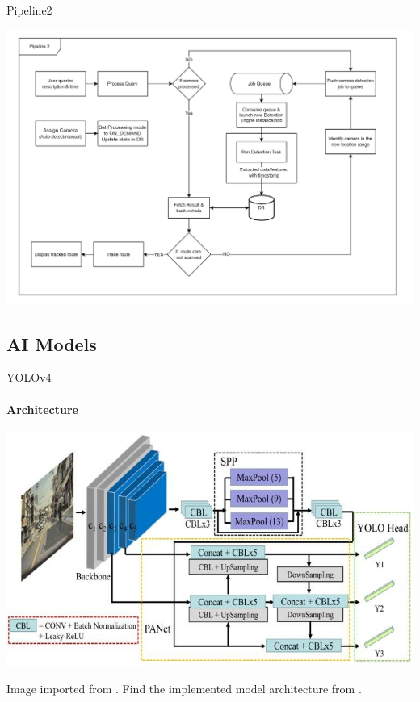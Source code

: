 \documentclass{beamer}
\newcommand{\link}[2]{\href{#1}{\textit{\color{blue}{#2}}}}%
\begin{document}
	\begin{frame}{Pipeline2}
		\begin{center}
			\includegraphics[width=\linewidth]{res/pipeline2}
		\end{center}
	\end{frame}

	\subsection{AI Models}
	\begin{frame}{YOLOv4}
		\framesubtitle{Architecture}
		\begin{center}
			\includegraphics[width=0.8\linewidth]{res/YOLOV4-research-gate.png}
		\end{center}
		Image imported from \link{https://www.researchgate.net/figure/Overall-structure-of-YOLOv4-including-CSPDarknet-backbone-SPPnet-PANet-and-3-YOLO\_fig2\_344919620}{researchgate}. Find the implemented model architecture from \link{https://github.com/Project-Dragon-Fly/Dragon-Fly-Slides/blob/main/final-implementation-review/res/yolov4-vehicle.svg}{here}.
	\end{frame}
\end{document}
